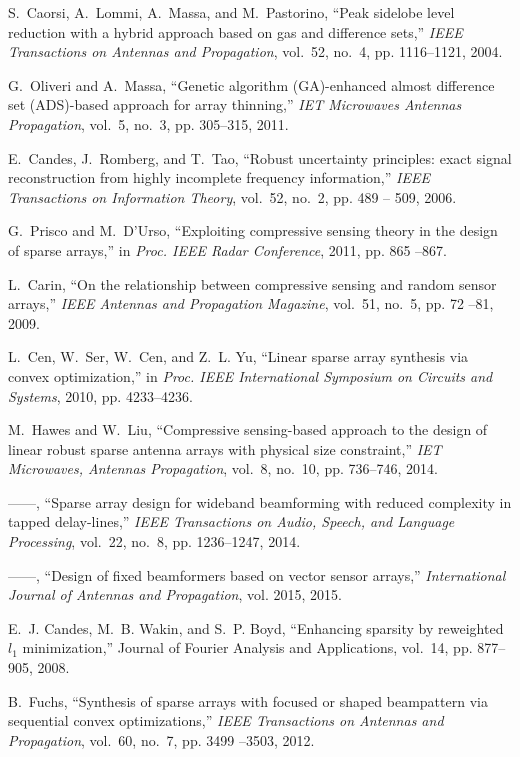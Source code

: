 \documentclass[10pt,final]{IEEEtran}
\begin{document}
\begin{thebibliography}{40}
S.~Caorsi, A.~Lommi, A.~Massa, and M.~Pastorino, ``Peak sidelobe level
  reduction with a hybrid approach based on gas and difference sets,''
  \emph{IEEE Transactions on Antennas and Propagation}, vol.~52, no.~4, pp.
  1116--1121, 2004.

G.~Oliveri and A.~Massa, ``Genetic algorithm ({GA})-enhanced almost difference
  set ({ADS})-based approach for array thinning,'' \emph{IET Microwaves
  Antennas Propagation}, vol.~5, no.~3, pp. 305--315, 2011.

E.~Candes, J.~Romberg, and T.~Tao, ``Robust uncertainty principles: exact
  signal reconstruction from highly incomplete frequency information,''
  \emph{IEEE Transactions on Information Theory}, vol.~52, no.~2, pp. 489 --
  509, 2006.

G.~Prisco and M.~D'Urso, ``Exploiting compressive sensing theory in the design
  of sparse arrays,'' in \emph{Proc. IEEE Radar Conference}, 2011, pp. 865
  --867.

L.~Carin, ``On the relationship between compressive sensing and random sensor
  arrays,'' \emph{IEEE Antennas and Propagation Magazine}, vol.~51, no.~5, pp.
  72 --81, 2009.

L.~Cen, W.~Ser, W.~Cen, and Z.~L. Yu, ``Linear sparse array synthesis via
  convex optimization,'' in \emph{Proc. IEEE International Symposium on
  Circuits and Systems}, 2010, pp. 4233--4236.

M.~Hawes and W.~Liu, ``Compressive sensing-based approach to the design of
  linear robust sparse antenna arrays with physical size constraint,''
  \emph{{IET} Microwaves, Antennas Propagation}, vol.~8, no.~10, pp. 736--746,
  2014.

------, ``Sparse array design for wideband beamforming with reduced complexity
  in tapped delay-lines,'' \emph{IEEE Transactions on Audio, Speech, and
  Language Processing}, vol.~22, no.~8, pp. 1236--1247, 2014.

------, ``Design of fixed beamformers based on vector sensor arrays,''
  \emph{International Journal of Antennas and Propagation}, vol. 2015, 2015.

E.~J. Candes, M.~B. Wakin, and S.~P. Boyd,
  ``{Enhancing sparsity by reweighted $l_{1}$
  minimization,}'' {Journal of Fourier
  Analysis and Applications}, vol.~14, pp. 877--905, 2008.

B.~Fuchs, ``Synthesis of sparse arrays with focused or shaped beampattern via
  sequential convex optimizations,'' \emph{IEEE Transactions on Antennas and
  Propagation}, vol.~60, no.~7, pp. 3499 --3503, 2012.


\end{thebibliography}
\end{document}
